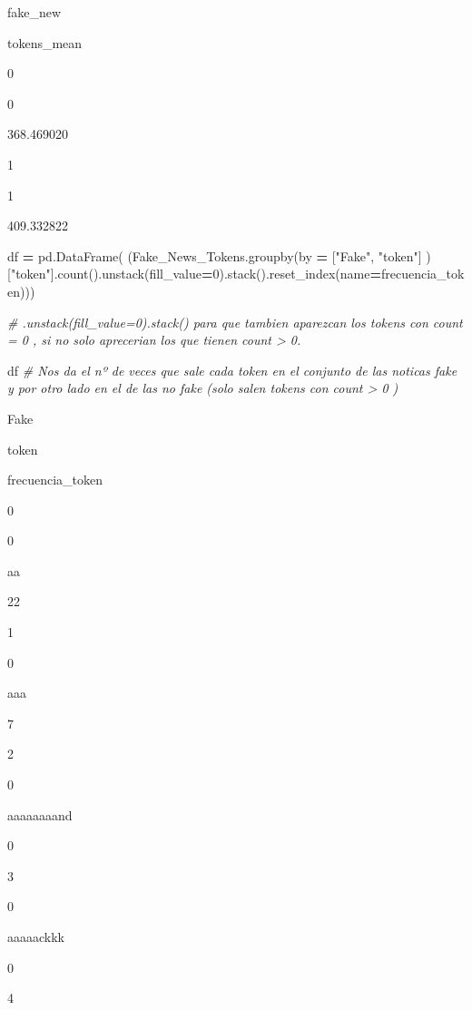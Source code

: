 \documentclass[
  11pt,
  a4paper,
]{article}
\newenvironment{Shaded}{\begin{snugshade}}{\end{snugshade}}
\newcommand{\CommentTok}[1]{\textcolor[rgb]{0.56,0.35,0.01}{\textit{#1}}}
\newcommand{\DecValTok}[1]{\textcolor[rgb]{0.00,0.00,0.81}{#1}}
\newcommand{\NormalTok}[1]{#1}
\newcommand{\OperatorTok}[1]{\textcolor[rgb]{0.81,0.36,0.00}{\textbf{#1}}}
\newcommand{\StringTok}[1]{\textcolor[rgb]{0.31,0.60,0.02}{#1}}
\begin{document}
fake\_new

tokens\_mean

0

0

368.469020

1

1

409.332822

\begin{Shaded}
\begin{Highlighting}[]
\NormalTok{df }\OperatorTok{=}\NormalTok{ pd.DataFrame(  (Fake\_News\_Tokens.groupby(by }\OperatorTok{=}\NormalTok{ [}\StringTok{"Fake"}\NormalTok{, }\StringTok{"token"}\NormalTok{] )[}\StringTok{"token"}\NormalTok{].count().unstack(fill\_value}\OperatorTok{=}\DecValTok{0}\NormalTok{).stack().reset\_index(name}\OperatorTok{=}\StringTok{\textquotesingle{}frecuencia\_token\textquotesingle{}}\NormalTok{)))}

\CommentTok{\# .unstack(fill\_value=0).stack() para que tambien aparezcan los tokens con count = 0 , si no solo aprecerian los que tienen count \textgreater{} 0.}
\end{Highlighting}
\end{Shaded}

\begin{Shaded}
\begin{Highlighting}[]
\NormalTok{df }\CommentTok{\# Nos da el nº de veces que sale cada token en el conjunto de las noticas fake y por otro lado en el de las no fake (solo salen tokens con count \textgreater{} 0 )}
\end{Highlighting}
\end{Shaded}

Fake

token

frecuencia\_token

0

0

aa

22

1

0

aaa

7

2

0

aaaaaaaand

0

3

0

aaaaackkk

0

4
\end{document}
